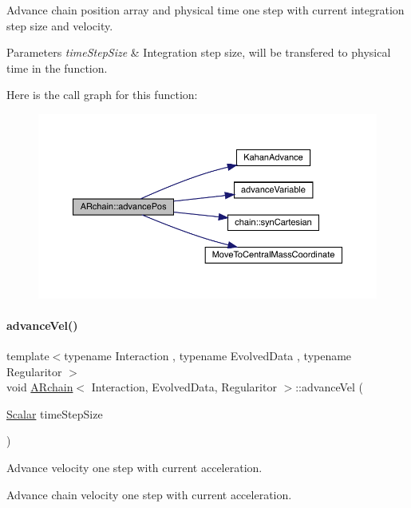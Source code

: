 Advance chain position array and physical time one step with current integration step size and velocity. 
\begin{DoxyParams}{Parameters}
{\em time\+Step\+Size} & Integration step size, will be transfered to physical time in the function. \\
\hline
\end{DoxyParams}
Here is the call graph for this function\+:\nopagebreak
\begin{figure}[H]
\begin{center}
\leavevmode
\includegraphics[width=350pt]{class_a_rchain_a8d3ac75a6b4231e0859492257553316e_cgraph}
\end{center}
\end{figure}
\mbox{\label{class_a_rchain_a6a76ab7a095adfbf4a69226a31d866d4}} 
\paragraph{\texorpdfstring{advance\+Vel()}{advanceVel()}}
{\footnotesize\ttfamily template$<$typename Interaction , typename Evolved\+Data , typename Regularitor $>$ \\
void \mbox{\hyperlink{class_a_rchain}{A\+Rchain}}$<$ Interaction, Evolved\+Data, Regularitor $>$\+::advance\+Vel (\begin{DoxyParamCaption}\item[{\mbox{\hyperlink{class_a_rchain_a707e42a79e4744424a34c9007e84ee07}{Scalar}}}]{time\+Step\+Size }\end{DoxyParamCaption})}



Advance velocity one step with current acceleration. 

Advance chain velocity one step with current acceleration.

